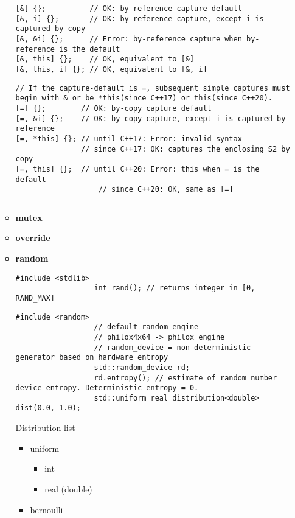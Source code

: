 \documentclass{article}
\begin{document}
\begin{itemize}
\begin{itemize}
\begin{lstlisting}[style=cpp]
[&] {};          // OK: by-reference capture default
[&, i] {};       // OK: by-reference capture, except i is captured by copy
[&, &i] {};      // Error: by-reference capture when by-reference is the default
[&, this] {};    // OK, equivalent to [&]
[&, this, i] {}; // OK, equivalent to [&, i]
			      \end{lstlisting}
		            \begin{lstlisting}[style=cpp]
// If the capture-default is =, subsequent simple captures must begin with & or be *this(since C++17) or this(since C++20). 
[=] {};        // OK: by-copy capture default
[=, &i] {};    // OK: by-copy capture, except i is captured by reference
[=, *this] {}; // until C++17: Error: invalid syntax
               // since C++17: OK: captures the enclosing S2 by copy
[=, this] {};  // until C++20: Error: this when = is the default
                   // since C++20: OK, same as [=]
			      \end{lstlisting}
		            \begin{lstlisting}[style=cpp]
			      \end{lstlisting}
		      \item \textbf{mutex}
		      \item \textbf{override}
		      \item \textbf{random}
		            \begin{lstlisting}[style=cpp]
			      #include <stdlib>
			      int rand(); // returns integer in [0, RAND_MAX]
			      \end{lstlisting}
		            \begin{lstlisting}[style=cpp]
			      #include <random>
			      // default_random_engine
			      // philox4x64 -> philox_engine
			      // random_device = non-deterministic generator based on hardware entropy
			      std::random_device rd;
			      rd.entropy(); // estimate of random number device entropy. Deterministic entropy = 0.
			      std::uniform_real_distribution<double> dist(0.0, 1.0);
			      \end{lstlisting}
		            Distribution list
		            \begin{itemize}
			            \item uniform
			                  \begin{itemize}
				                  \item int
				                  \item real (double)
			                  \end{itemize}
			            \item bernoulli

\end{itemize}
\end{itemize}
\end{itemize}
\end{document}
